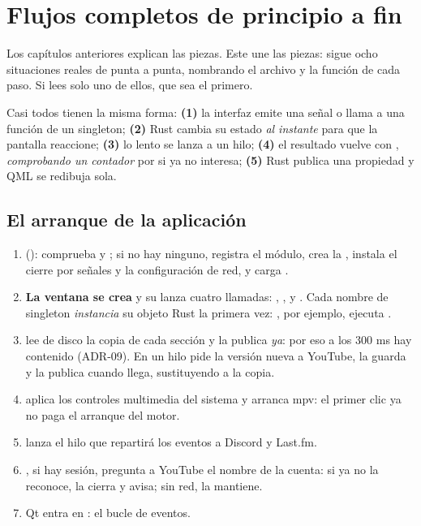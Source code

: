 \chapter{Flujos completos de principio a fin}
\label{cap:flujos}

Los capítulos anteriores explican las piezas. Este une las piezas: sigue ocho situaciones
reales de punta a punta, nombrando el archivo y la función de cada paso. Si lees solo uno de
ellos, que sea el primero.

\begin{idea}
Casi todos tienen la misma forma: \textbf{(1)} la interfaz emite una señal o llama a una
función de un singleton; \textbf{(2)} Rust cambia su estado \emph{al instante} para que la
pantalla reaccione; \textbf{(3)} lo lento se lanza a un hilo; \textbf{(4)} el resultado vuelve
con , \emph{comprobando un contador} por si ya no interesa; \textbf{(5)} Rust
publica una propiedad y QML se redibuja sola.
\end{idea}

\section{El arranque de la aplicación}

\begin{enumerate}
  \item \textbf{} (): comprueba  y
  ; si no hay ninguno, registra el módulo, crea la , instala
  el cierre por señales y la configuración de red, y carga .
  \item \textbf{La ventana se crea} y su  lanza cuatro llamadas:
  , ,  y
  . Cada nombre de singleton \emph{instancia} su objeto Rust la primera
  vez: , por ejemplo, ejecuta .
  \item \textbf{} lee de disco la copia de cada sección y la publica
  \emph{ya}: por eso a los 300 ms hay contenido (ADR-09). En un hilo pide la versión nueva a
  YouTube, la guarda y la publica cuando llega, sustituyendo a la copia.
  \item \textbf{} aplica los controles multimedia del sistema y arranca
  mpv: el primer clic ya no paga el arranque del motor.
  \item \textbf{} lanza el hilo  que repartirá los eventos a
  Discord y Last.fm.
  \item \textbf{}, si hay sesión, pregunta a YouTube el nombre de la
  cuenta: si ya no la reconoce, la cierra y avisa; sin red, la mantiene.
  \item Qt entra en : el bucle de eventos.
\end{enumerate}


